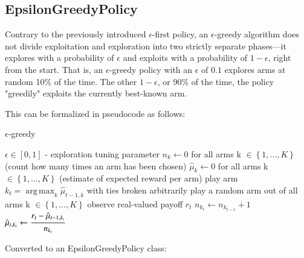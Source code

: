 \documentclass{jss}
\DeclareMathOperator*{\argmax}{arg\,max}
\begin{document}
\subsection{EpsilonGreedyPolicy} \label{epsgreedy}

Contrary to the previously introduced $\epsilon$-first policy, an $\epsilon$-greedy algorithm \citep{Sutton1998e} does not divide exploitation and exploration into two strictly separate phases---it explores with a probability of $\epsilon$ and exploits with a probability of $1-\epsilon$, right from the start. That is, an $\epsilon$-greedy policy with an $\epsilon$ of $0.1$ explores arms at random 10\% of the time. The other $1-\epsilon$, or 90\% of the time, the policy "greedily" exploits the currently best-known arm.

This can be formalized in pseudocode as follows:

\begin{algorithm}[H]
\caption{$\epsilon$-greedy}
\label{Alg:EpsilonGreedy}
\begin{algorithmic}
\REQUIRE \(    \epsilon  \in \left[ 0,1 \right] \) - exploration tuning parameter
\STATE \( n_{k} \leftarrow 0 \) for all arms k \(  \in \left\{ 1, \dots, K \right\} \)  (count how many times an arm has been chosen)
\STATE \( \hat{\mu}_{k} \leftarrow 0 \) for all arms k  \(   \in \left\{ 1, \dots, K \right\} \)  (estimate of expected reward per arm)
		\STATE play arm \(k_t = \argmax_k  \hat{\mu}_{t-1,k}  \) with ties broken arbitrarily
	\ELSE
		\STATE play a random arm out of all arms k \(  \in \left\{ 1, \dots, K \right\} \)
	\ENDIF
	\STATE observe real-valued payoff $r_t$
	\STATE \( n_{k_{t}} \leftarrow n_{k_{t-1}} + 1  \) 
  \STATE \( \hat{\mu}_{t,k_{t}} \leftarrow   \cfrac{r_t - \hat{\mu}_{t-1,k_{t}} }{n_{k_{t}}}   \) 
\ENDFOR
\end{algorithmic}
\end{algorithm}

Converted to an EpsilonGreedyPolicy class:
\end{document}
